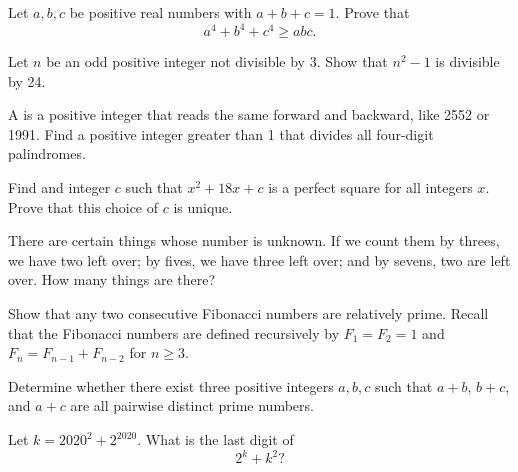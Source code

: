 \documentclass[12pt]{article}
\begin{document}
        \begin{exercise}
            Let \(a,b,c\) be positive real numbers with \(a+b+c=1\). Prove that
            \[a^4 + b^4 + c^4 \geq abc.\]
        \end{exercise}
    
        \begin{exercise}
            Let \(n\) be an odd positive integer not divisible by 3. Show that \(n^2-1\) is divisible by 24.
        \end{exercise}
    
        \begin{exercise}
            A  is a positive integer that reads the same forward and backward, like 2552 or 1991. 
            Find a positive integer greater than 1 that divides all four-digit palindromes.
        \end{exercise}
    
        \begin{exercise}
            Find and integer \(c\) such that \(x^2+18x+c\) is a perfect square for all integers \(x\). 
            Prove that this choice of \(c\) is unique. 
        \end{exercise}
    
        \begin{exercise}
            There are certain things whose number is unknown. 
            If we count them by threes, we have two left over; by fives, we have three left over; and by sevens, two are left over. 
            How many things are there?
        \end{exercise}
    
        \begin{exercise}
            Show that any two consecutive Fibonacci numbers are relatively prime. 
            Recall that the Fibonacci numbers are defined recursively by \(F_1=F_2=1\) and \(F_n=F_{n-1}+F_{n-2}\) for \(n\geq 3\).
        \end{exercise}
    
        \begin{exercise}
            Determine whether there exist three positive integers \(a,b,c\) such that \(a+b\), \(b+c\), and \(a+c\) are all pairwise distinct prime numbers.
        \end{exercise}
    
        \begin{exercise}
            Let \(k=2020^2+2^{2020}\).
            What is the last digit of
            \[2^k+k^2\textrm{?}\]
        \end{exercise}
    
\end{document}
